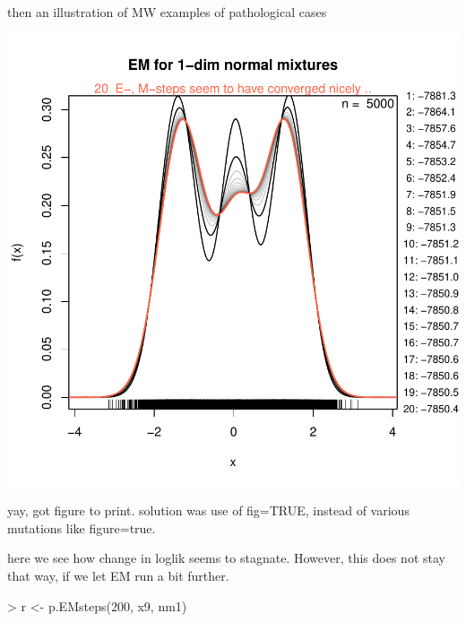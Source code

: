 then an illustration of MW examples of pathological cases


\includegraphics{chapter1-002}


yay, got figure to print. solution was use of fig=TRUE, instead of various mutations like figure=true.

here we see how change in loglik seems to stagnate. However, this does not stay that way, if we let EM run a bit further.

\begin{Schunk}
\begin{Sinput}
> r <- p.EMsteps(200, x9, nm1)
\end{Sinput}
\end{Schunk}

